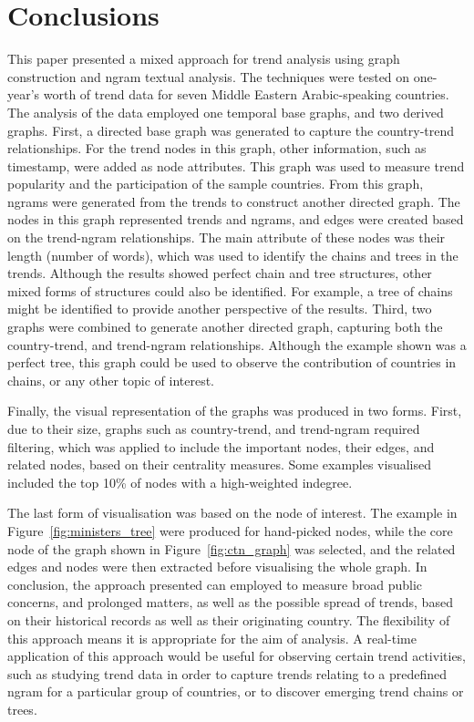 \documentclass{comjnl}
\begin{document}
{\section{Conclusions}\label{conclusions}

This paper presented a mixed approach for trend analysis using graph construction and ngram textual analysis. The techniques were tested on one-year’s worth of trend data for seven Middle Eastern Arabic-speaking countries. The analysis of the data employed one temporal base graphs, and two derived graphs.  First, a directed base graph was generated to capture the country-trend relationships. For the trend nodes in this graph, other information, such as timestamp, were added as node attributes. This graph was used to measure trend popularity and the participation of the sample countries. From this graph, ngrams were generated from the trends to construct another directed graph. The nodes in this graph represented trends and ngrams, and edges were created based on the trend-ngram relationships. The main attribute of these nodes was their length (number of words), which was used to identify the chains and trees in the trends. Although the results showed perfect chain and tree structures, other mixed forms of structures could also be identified. For example, a tree of chains might be identified to provide another perspective of the results. Third, two graphs were combined to generate another directed graph, capturing both the country-trend, and trend-ngram relationships. Although the example shown was a perfect tree, this graph could be used to observe the contribution of countries in chains, or any other topic of interest. 

Finally, the visual representation of the graphs was produced in two forms. First, due to their size, graphs such as country-trend, and trend-ngram required filtering, which was applied to include the important nodes, their edges, and related nodes, based on their centrality measures. Some examples visualised included the top 10\% of nodes with a high-weighted indegree. 

The last form of visualisation was based on the node of interest. The example in Figure~\ref{fig:ministers_tree} were produced for hand-picked nodes, while the core node of the graph shown in Figure~\ref{fig:ctn_graph} was selected, and the related edges and nodes were then extracted before visualising the whole graph.  In conclusion, the approach presented can employed to measure broad public concerns, and prolonged matters, as well as the possible spread of trends, based on their historical records as well as their originating country. The flexibility of this approach means it is appropriate for the aim of analysis.  A real-time application of this approach would be useful for observing certain trend activities, such as studying trend data in order to capture trends relating to a predefined ngram for a particular group of countries, or to discover emerging trend chains or trees.

}
\end{document}
